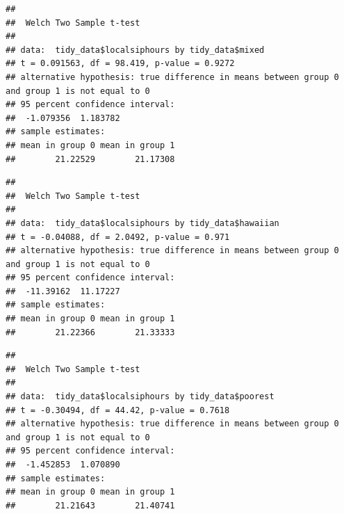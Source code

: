 \documentclass[
  11 pt,
]{article}
\newenvironment{Shaded}{\begin{snugshade}}{\end{snugshade}}
\newcommand{\AttributeTok}[1]{\textcolor[rgb]{0.77,0.63,0.00}{#1}}
\newcommand{\CommentTok}[1]{\textcolor[rgb]{0.56,0.35,0.01}{\textit{#1}}}
\newcommand{\ConstantTok}[1]{\textcolor[rgb]{0.00,0.00,0.00}{#1}}
\newcommand{\FunctionTok}[1]{\textcolor[rgb]{0.00,0.00,0.00}{#1}}
\newcommand{\NormalTok}[1]{#1}
\newcommand{\SpecialCharTok}[1]{\textcolor[rgb]{0.00,0.00,0.00}{#1}}
\begin{document}
\begin{verbatim}
## 
##  Welch Two Sample t-test
## 
## data:  tidy_data$localsiphours by tidy_data$mixed
## t = 0.091563, df = 98.419, p-value = 0.9272
## alternative hypothesis: true difference in means between group 0 and group 1 is not equal to 0
## 95 percent confidence interval:
##  -1.079356  1.183782
## sample estimates:
## mean in group 0 mean in group 1 
##        21.22529        21.17308
\end{verbatim}

\begin{Shaded}
\end{Shaded}

\begin{verbatim}
## 
##  Welch Two Sample t-test
## 
## data:  tidy_data$localsiphours by tidy_data$hawaiian
## t = -0.04088, df = 2.0492, p-value = 0.971
## alternative hypothesis: true difference in means between group 0 and group 1 is not equal to 0
## 95 percent confidence interval:
##  -11.39162  11.17227
## sample estimates:
## mean in group 0 mean in group 1 
##        21.22366        21.33333
\end{verbatim}

\begin{Shaded}
\end{Shaded}

\begin{verbatim}
## 
##  Welch Two Sample t-test
## 
## data:  tidy_data$localsiphours by tidy_data$poorest
## t = -0.30494, df = 44.42, p-value = 0.7618
## alternative hypothesis: true difference in means between group 0 and group 1 is not equal to 0
## 95 percent confidence interval:
##  -1.452853  1.070890
## sample estimates:
## mean in group 0 mean in group 1 
##        21.21643        21.40741
\end{verbatim}
\end{document}
